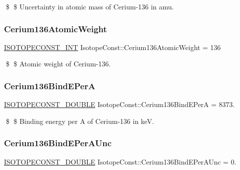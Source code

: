 \$ \$ Uncertainty in atomic mass of Cerium-\/136 in amu. \mbox{\label{group___isotope_const-_cerium-_ce136_gad8ea6fbbd6db028228cae4b108fbf20b}} 
\subsubsection{\texorpdfstring{Cerium136\+Atomic\+Weight}{Cerium136AtomicWeight}}
{\footnotesize\ttfamily \mbox{\hyperlink{group___isotope_const-_macros_ga5f18360b3e99483a35c32d789e62621c}{I\+S\+O\+T\+O\+P\+E\+C\+O\+N\+S\+T\+\_\+\+I\+NT}} Isotope\+Const\+::\+Cerium136\+Atomic\+Weight = 136}

\$ \$ Atomic weight of Cerium-\/136. \mbox{\label{group___isotope_const-_cerium-_ce136_gac9d39fd4b167ab2872a7174ebf561f20}} 
\subsubsection{\texorpdfstring{Cerium136\+Bind\+E\+PerA}{Cerium136BindEPerA}}
{\footnotesize\ttfamily \mbox{\hyperlink{group___isotope_const-_macros_ga8f45a7272ce02c0b4c65c44636ed719a}{I\+S\+O\+T\+O\+P\+E\+C\+O\+N\+S\+T\+\_\+\+D\+O\+U\+B\+LE}} Isotope\+Const\+::\+Cerium136\+Bind\+E\+PerA = 8373.}

\$ \$ Binding energy per A of Cerium-\/136 in keV. \mbox{\label{group___isotope_const-_cerium-_ce136_ga84151a410aa0e08cd087c067e0949ce8}} 
\subsubsection{\texorpdfstring{Cerium136\+Bind\+E\+Per\+A\+Unc}{Cerium136BindEPerAUnc}}
{\footnotesize\ttfamily \mbox{\hyperlink{group___isotope_const-_macros_ga8f45a7272ce02c0b4c65c44636ed719a}{I\+S\+O\+T\+O\+P\+E\+C\+O\+N\+S\+T\+\_\+\+D\+O\+U\+B\+LE}} Isotope\+Const\+::\+Cerium136\+Bind\+E\+Per\+A\+Unc = 0.}

